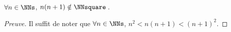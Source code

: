 \begin{fact} \label{case-2}
	 $\forall n \in \NNs$, $n(n+1) \notin \NNsquare$\,.
\end{fact}




\begin{proof}[Preuve]
	Il suffit de noter que $\forall n \in \NNs$, $n^2 < n(n+1) < (n+1)^2$.
\end{proof}
